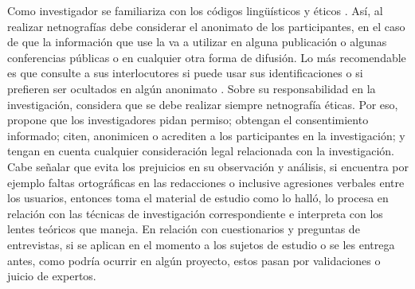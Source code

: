 Como investigador se familiariza con los códigos lingüísticos y éticos
\cite{Tagg2017}. Así, al realizar netnografías debe
considerar el anonimato de los participantes, en el caso de que la
información que use la va a utilizar en alguna publicación o algunas
conferencias públicas o en cualquier otra forma de difusión. Lo más
recomendable es que consulte a sus interlocutores si puede usar sus
identificaciones o si prefieren ser ocultados en algún anonimato
\cite{boellstorff2012ethnography}. Sobre su responsabilidad en la
investigación, \textcite{kozinets2010} considera que se debe realizar siempre
netnografía éticas. Por eso, propone que los investigadores pidan
permiso; obtengan el consentimiento informado; citen, anonimicen o
acrediten a los participantes en la investigación; y tengan en cuenta
cualquier consideración legal relacionada con la investigación. Cabe
señalar que evita los prejuicios en su observación y análisis, si
encuentra por ejemplo faltas ortográficas en las redacciones o inclusive
agresiones verbales entre los usuarios, entonces toma el material de
estudio como lo halló, lo procesa en relación con las técnicas de
investigación correspondiente e interpreta con los lentes teóricos que
maneja. En relación con cuestionarios y preguntas de entrevistas, si se
aplican en el momento a los sujetos de estudio o se les entrega antes,
como podría ocurrir en algún proyecto, estos pasan por validaciones o
juicio de expertos.

